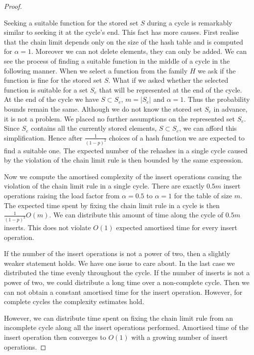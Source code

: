 \begin{proof}
\begin{itemize}
Seeking a suitable function for the stored set $S$ during a cycle is remarkably similar to seeking it at the cycle's end. This fact has more causes. First realise that the chain limit depends only on the size of the hash table and is computed for $\alpha = 1$. Moreover we can not delete elements, they can only be added. We can see the process of finding a suitable function in the middle of a cycle in the following manner. When we select a function from the family $H$ we ask if the function is fine for the stored set $S$. What if we asked whether the selected function is suitable for a set $S_e$ that will be represented at the end of the cycle. At the end of the cycle we have $S \subset S_e$, $m = |S_e|$ and $\alpha = 1$. Thus the probability bounds remain the same. Although we do not know the stored set $S_e$ in advance, it is not a problem. We placed no further assumptions on the represented set $S_e$. Since $S_e$ contains all the currently stored elements, $S \subset S_e$, we can afford this simplification. Hence after $\frac{1}{(1-p)^2}$ choices of a hash function we are expected to find a suitable one. The expected number of the rehashes in a single cycle caused by the violation of the chain limit rule is then bounded by the same expression. 

Now we compute the amortised complexity of the insert operations causing the violation of the chain limit rule in a single cycle. There are exactly $0.5 m$ insert operations raising the load factor from $\alpha = 0.5$ to $\alpha = 1$ for the table of size $m$. The expected time spent by fixing the chain limit rule in a cycle is then $\frac{1}{(1 - p)^2}O(m)$. We can distribute this amount of time along the cycle of $0.5 m$ inserts. This does not violate $O(1)$ expected amortised time for every insert operation.
\end{itemize}

If the number of the insert operations is not a power of two, then a slightly weaker statement holds. We have one issue to care about. In the last case we distributed the time evenly throughout the cycle. If the number of inserts is not a power of two, we could distribute a long time over a non-complete cycle. Then we can not obtain a constant amortised time for the insert operation. However, for complete cycles the complexity estimates hold.

However, we can distribute time spent on fixing the chain limit rule from an incomplete cycle along all the insert operations performed. Amortised time of the insert operation then converges to $O(1)$ with a growing number of insert operations.
\end{proof}

